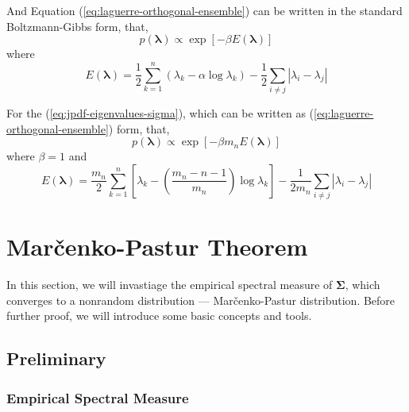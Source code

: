 And Equation (\ref{eq:laguerre-orthogonal-ensemble}) can be written in the standard Boltzmann-Gibbs form, that,
\begin{equation*}
    p\left(\boldsymbol{\lambda}\right)\propto\exp\left[-\beta E\left(\boldsymbol{\lambda}\right)\right]
\end{equation*}
where
\begin{equation}
    E\left(\boldsymbol{\lambda}\right)=\frac{1}{2}\sum_{k=1}^{n}\left(\lambda_{k}-\alpha\log\lambda_{k}\right)-\frac{1}{2}\sum_{i\neq j}\left|\lambda_{i}-\lambda_{j}\right|
\end{equation}

\begin{remark}
    For the (\ref{eq:jpdf-eigenvalues-sigma}), which can be written as (\ref{eq:laguerre-orthogonal-ensemble}) form, that,
    \begin{equation*}
        p\left(\boldsymbol{\lambda}\right)\propto\exp\left[-\beta m_{n}E\left(\boldsymbol{\lambda}\right)\right]
    \end{equation*}
    where $\beta=1$ and
    \begin{equation*}
        E\left(\boldsymbol{\lambda}\right)=\frac{m_{n}}{2}\sum_{k=1}^{n}\left[\lambda_{k}-\left(\frac{m_{n}-n-1}{m_{n}}\right)\log\lambda_{k}\right]-\frac{1}{2m_{n}}\sum_{i\neq j}\left|\lambda_{i}-\lambda_{j}\right|
    \end{equation*}
\end{remark}

\section{Marčenko-Pastur Theorem}

In this section, we will invastiage the empirical spectral measure of $\boldsymbol{\Sigma}$, which converges to a nonrandom distribution --- Marčenko-Pastur distribution. Before further proof, we will introduce some basic concepts and tools.

\subsection{Preliminary}

\subsubsection{Empirical Spectral Measure}

